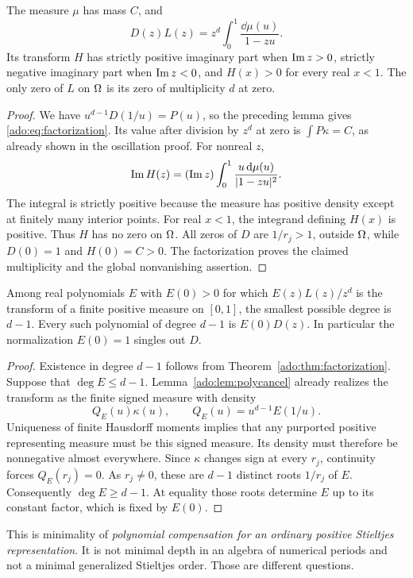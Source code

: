 \begin{theorem}
\label{ado:thm:factorization}
The measure $\mu$ has mass $C$, and
\begin{equation}\label{ado:eq:factorization}
 D(z)L(z)=z^d\int_0^1\frac{\dd\mu(u)}{1-zu}.
\end{equation}
Its transform $H$ has strictly positive imaginary part when
$\operatorname{Im} z>0$, strictly negative imaginary part when $\operatorname{Im} z<0$, and
$H(x)>0$ for every real $x<1$. The only zero of $L$ on $\Omega$ is its
zero of multiplicity $d$ at zero.
\end{theorem}
\begin{proof}
We have $u^{d-1}D(1/u)=P(u)$, so the preceding lemma gives
\eqref{ado:eq:factorization}. Its value after division by $z^d$ at
zero is $\int P\kappa=C$, as already shown in the oscillation proof.
For nonreal $z$,
\[
 \operatorname{Im} H(z)=(\operatorname{Im} z)\int_0^1
              \frac{u\,\mathrm d\mu(u)}{|1-zu|^2}.
\]
The integral is strictly positive because the measure has positive
density except at finitely many interior points. For real $x<1$,
the integrand defining $H(x)$ is positive. Thus $H$ has no zero on
$\Omega$. All zeros of $D$ are $1/r_j>1$, outside $\Omega$, while
$D(0)=1$ and $H(0)=C>0$. The factorization proves the claimed
multiplicity and the global nonvanishing assertion.
\end{proof}

\begin{theorem}
\label{ado:thm:minimality}
Among real polynomials $E$ with $E(0)>0$ for which $E(z)L(z)/z^d$
is the transform of a finite positive measure on $[0,1]$, the smallest
possible degree is $d-1$. Every such polynomial of degree $d-1$ is
$E(0)D(z)$. In particular the normalization $E(0)=1$ singles out $D$.
\end{theorem}
\begin{proof}
Existence in degree $d-1$ follows from
Theorem~\ref{ado:thm:factorization}. Suppose that $\deg E\le d-1$.
Lemma~\ref{ado:lem:polycancel} already realizes the transform as the
finite signed measure with density
\[
 Q_E(u)\kappa(u),\qquad Q_E(u)=u^{d-1}E(1/u).
\]
Uniqueness of finite Hausdorff moments implies that any purported
positive representing measure must be this signed measure. Its density
must therefore be nonnegative almost everywhere. Since $\kappa$
changes sign at every $r_j$, continuity forces $Q_E(r_j)=0$.
As $r_j\ne0$, these are $d-1$ distinct roots $1/r_j$ of $E$.
Consequently $\deg E\ge d-1$. At equality those roots determine
$E$ up to its constant factor, which is fixed by $E(0)$.
\end{proof}
This is minimality of \emph{polynomial compensation for an ordinary
positive Stieltjes representation}. It is not minimal depth in an
algebra of numerical periods and not a minimal generalized Stieltjes
order. Those are different questions.

